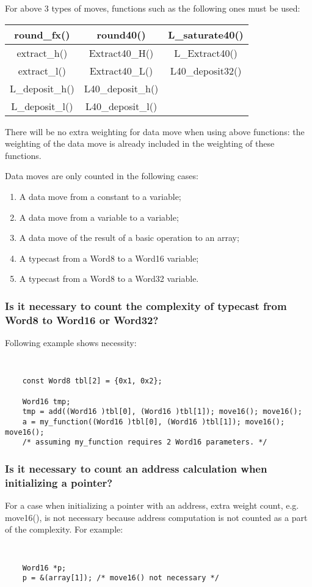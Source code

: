 For above 3 types of moves, functions such as the following ones
must be used:
\begin{center}
    \begin{tabular}{|c|c|c|}
        \hline
        \hline round\_fx() & round40()   & L\_saturate40()\\
        \hline extract\_h() & Extract40\_H()   & L\_Extract40()\\
        \hline extract\_l() & Extract40\_L()   & L40\_deposit32()\\
        \hline L\_deposit\_h()   & L40\_deposit\_h() & \\
        \hline L\_deposit\_l()   & L40\_deposit\_l() & \\
        \hline
    \end{tabular}
\end{center}

There will be no extra weighting for data move when using above
functions: the weighting of the data move is already included in
the weighting of these functions.

Data moves are only counted in
the following cases:
\begin{enumerate}
    \item A data move from a constant to a variable;
    \item A data move from a variable to a variable;
    \item A data move of the result of a basic operation to an array;
    \item A typecast from a Word8 to a Word16 variable;
    \item A typecast from a Word8 to a Word32 variable.
\end{enumerate}

\subsubsection{Is it necessary to count the complexity of typecast
from Word8 to Word16 or Word32?}
Following example shows necessity:
{\tt\small
\begin{verbatim}
    const Word8 tbl[2] = {0x1, 0x2};

    Word16 tmp;
    tmp = add((Word16 )tbl[0], (Word16 )tbl[1]); move16(); move16();
    a = my_function((Word16 )tbl[0], (Word16 )tbl[1]); move16(); move16();
    /* assuming my_function requires 2 Word16 parameters. */
\end{verbatim}
}

\subsubsection{Is it necessary to count an address calculation when initializing a pointer?}
For a case when initializing a pointer with an address, extra weight
count, e.g. move16(), is not necessary because address computation is
not counted as a part of the complexity. For example:
{\tt\small
\begin{verbatim}
    Word16 *p;
    p = &(array[1]); /* move16() not necessary */
\end{verbatim}
}%

